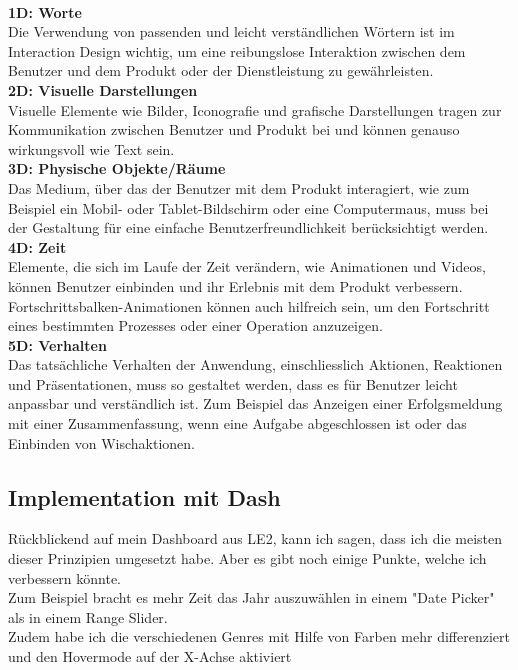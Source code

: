 \documentclass{article}
\begin{document}
\noindent
\\
\textbf{1D: Worte}\\
Die Verwendung von passenden und leicht verständlichen Wörtern ist im Interaction Design wichtig, um eine reibungslose Interaktion zwischen dem Benutzer und dem Produkt oder der Dienstleistung zu gewährleisten.
\\
\textbf{2D: Visuelle Darstellungen}\\
Visuelle Elemente wie Bilder, Iconografie und grafische Darstellungen tragen zur Kommunikation zwischen Benutzer und Produkt bei und können genauso wirkungsvoll wie Text sein.
\\
\textbf{3D: Physische Objekte/Räume}\\
Das Medium, über das der Benutzer mit dem Produkt interagiert, wie zum Beispiel ein Mobil- oder Tablet-Bildschirm oder eine Computermaus, muss bei der Gestaltung für eine einfache Benutzerfreundlichkeit berücksichtigt werden.
\\
\textbf{4D: Zeit}\\
Elemente, die sich im Laufe der Zeit verändern, wie Animationen und Videos, können Benutzer einbinden und ihr Erlebnis mit dem Produkt verbessern. Fortschrittsbalken-Animationen können auch hilfreich sein, um den Fortschritt eines bestimmten Prozesses oder einer Operation anzuzeigen.
\\
\textbf{5D: Verhalten}\\
Das tatsächliche Verhalten der Anwendung, einschliesslich Aktionen, Reaktionen und Präsentationen, muss so gestaltet werden, dass es für Benutzer leicht anpassbar und verständlich ist. Zum Beispiel das Anzeigen einer Erfolgsmeldung mit einer Zusammenfassung, wenn eine Aufgabe abgeschlossen 
ist oder das Einbinden von Wischaktionen.\cite{devazya_interaction_2022}

\subsection{Implementation mit Dash}
Rückblickend auf mein Dashboard aus LE2, kann ich sagen, dass ich die meisten dieser Prinzipien umgesetzt habe. Aber es gibt noch einige Punkte, welche ich verbessern könnte.\\
Zum Beispiel bracht es mehr Zeit das Jahr auszuwählen in einem "Date Picker" als in einem Range Slider.\\
Zudem habe ich die verschiedenen Genres mit Hilfe von Farben mehr differenziert und den Hovermode auf der X-Achse aktiviert\\
\end{document}
